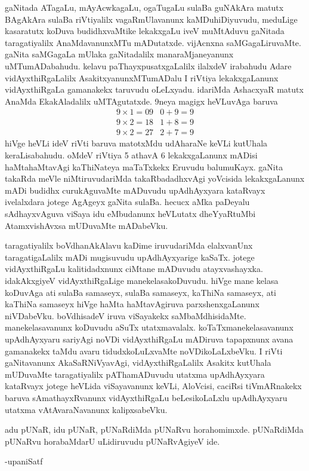 gaNitada ATagaLu, mAyAcwkagaLu, ogaTugaLu sulaBa guNAkAra matutx BAgAkAra sulaBa riVtiyalilx vagaRmUlavanunx kaMDuhiDiyuvudu, meduLige kasaratutx koDuva budidhxvaMtike lekakxgaLu iveV muMtAduvu gaNitada taragatiyalilx AnaMdavanunxMTu mADutatxde. vijAcnxna saMGagaLiruvaMte. gaNita saMGagaLa mUlaka gaNitadalilx manaraMjaneyanunx uMTumADabahudu. kelavu paThayxpusatxgaLalilx ilalxdeV irabahudu Adare vidAyxthiRgaLalilx AsakitxyanunxMTumADalu I riVtiya lekakxgaLanunx vidAyxthiRgaLa gamanakekx taruvudu oLeLxyadu. idariMda AshacxyaR matutx AnaMda EkakAladalilx uMTAgutatxde. {\rm 9}neya magigx heVLuvAga baruva 
$$
\begin{matrix}
9\times 1=09 & 0+9 = 9\\
9\times 2=18 & 1+8 = 9\\
9\times 2=27 & 2+7 = 9
\end{matrix}
$$ hiVge heVLi ideV riVti baruva matotxMdu udAharaNe keVLi kutUhala keraLisabahudu. oMdeV riVtiya {\rm 5} athavA {\rm 6} lekakxgaLanunx mADisi haMtahaMtavAgi kaThiNateya maTaTxkekx Eruvudu balumuKayx. gaNita takaRda meVle niMtiruvudariMda takaRbadadhxvAgi yoVcisida lekakxgaLanunx mADi budidhx curukAguvaMte mADuvudu upAdhAyxyara kataRvayx ivelalxdara jotege AgAgeyx gaNita sulaBa. hecucx aMka paDeyalu sAdhayxvAguva viSaya idu eMbudanunx heVLutatx dheYyaRtuMbi AtamxvishAvxsa mUDuvaMte mADabeVku.

taragatiyalilx boVdhanAkAlavu kaDime iruvudariMda elalxvanUnx taragatigaLalilx mADi mugisuvudu upAdhAyxyarige kaSaTx. jotege vidAyxthiRgaLu kalitidadxnunx ciMtane mADuvudu atayxvashayxka. idakAkxgiyeV vidAyxthiRgaLige manekelasakoDuvudu. hiVge mane kelasa koDuvAga ati sulaBa samaseyx, sulaBa samaseyx, kaThiNa samaseyx, ati kaThiNa samaseyx hiVge haMta haMtavAgiruva parxshenxgaLanunx niVDabeVku. boVdhisadeV iruva viSayakekx saMbaMdhisidaMte.
manekelasavanunx koDuvudu aSuTx utatxmavalalx. koTaTxmanekelasavanunx upAdhAyxyaru sariyAgi noVDi vidAyxthiRgaLu mADiruva tapapxnunx avana gamanakekx taMdu avaru tidudxkoLuLxvaMte noVDikoLaLxbeVku. I riVti gaNitavanunx AkaSaRNiVyavAgi, vidAyxthiRgaLalilx Asakitx kutUhala mUDuvaMte taragatiyalilx pAThamADuvudu utatxma upAdhAyxyara kataRvayx jotege heVLida viSayavanunx keVLi, AloVcisi, caciRsi tiVmARnakekx baruva sAmathayxRvanunx vidAyxthiRgaLu beLesikoLaLxlu upAdhAyxyaru utatxma vAtAvaraNavanunx kalipxsabeVku.

adu pUNaR, idu pUNaR, pUNaRdiMda pUNaRvu horahomimxde. pUNaRdiMda pUNaRvu horabaMdarU uLidiruvudu pUNaRvAgiyeV ide.

\begin{flushright}
-upaniSatf
\end{flushright}

